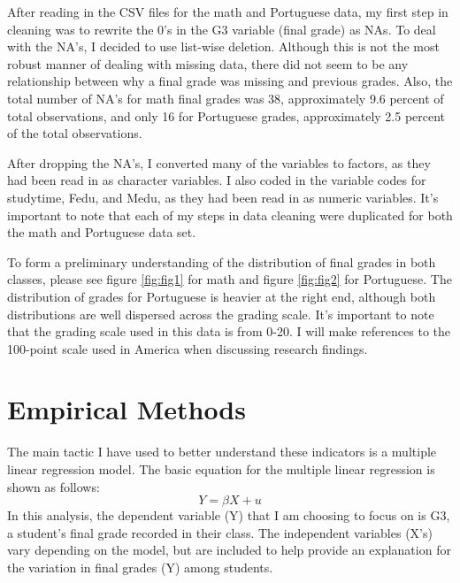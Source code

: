 \documentclass[12pt,english]{article}
\begin{document}
After reading in the CSV files for the math and Portuguese data, my first step in cleaning was to rewrite the 0's in the G3 variable (final grade) as NAs. To deal with the NA's, I decided to use list-wise deletion. Although this is not the most robust manner of dealing with missing data, there did not seem to be any relationship between why a final grade was missing and previous grades. Also, the total number of NA's for math final grades was 38, approximately 9.6 percent of total observations, and only 16 for Portuguese grades, approximately 2.5 percent of the total observations.

After dropping the NA's, I converted many of the variables to factors, as they had been read in as character variables. I also coded in the variable codes for studytime, Fedu, and Medu, as they had been read in as numeric variables. It's important to note that each of my steps in data cleaning were duplicated for both the math and Portuguese data set.

To form a preliminary understanding of the distribution of final grades in both classes, please see figure \ref{fig:fig1} for math and figure \ref{fig:fig2} for Portuguese. The distribution of grades for Portuguese is heavier at the right end, although both distributions are well dispersed across the grading scale. It's important to note that the grading scale used in this data is from 0-20. I will make references to the 100-point scale used in America when discussing research findings.

\section{Empirical Methods}\label{sec:methods}
The main tactic I have used to better understand these indicators is a multiple linear regression model. The basic equation for the multiple linear regression is shown as follows: 
\begin{equation}
        Y = \beta{X} + u
\end{equation} 
In this analysis, the dependent variable (Y) that I am choosing to focus on is G3, a student's final grade recorded in their class. The independent variables (X's) vary depending on the model, but are included to help provide an explanation for the variation in final grades (Y) among students.
\end{document}
